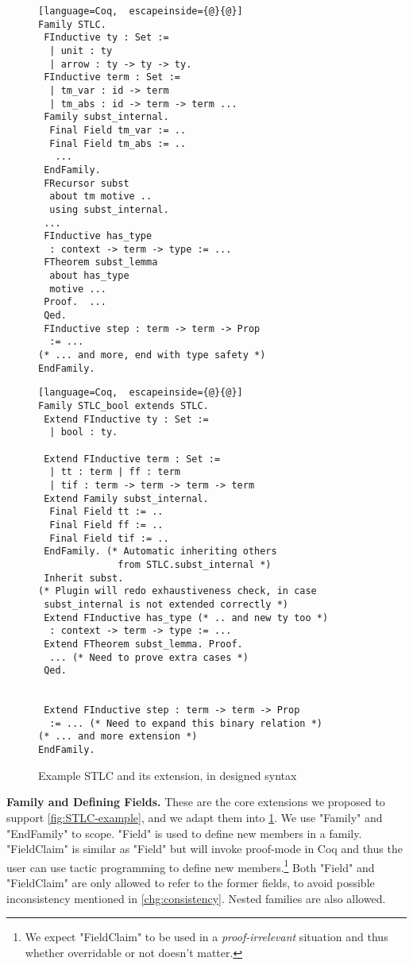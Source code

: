 \begin{figure}[!htb]
  \begin{minipage}[t]{0.47\linewidth}
\begin{lstlisting}[language=Coq,  escapeinside={@}{@}]
Family STLC.
 FInductive ty : Set :=
  | unit : ty
  | arrow : ty -> ty -> ty.
 FInductive term : Set := 
  | tm_var : id -> term 
  | tm_abs : id -> term -> term ...
 Family subst_internal.
  Final Field tm_var := ..
  Final Field tm_abs := ..
   ...
 EndFamily.
 FRecursor subst
  about tm motive ..
  using subst_internal.
 ...
 FInductive has_type 
  : context -> term -> type := ...
 FTheorem subst_lemma 
  about has_type 
  motive ...
 Proof.  ...
 Qed.
 FInductive step : term -> term -> Prop 
  := ...
(* ... and more, end with type safety *)
EndFamily.
\end{lstlisting}
  \end{minipage}
  \begin{minipage}[t]{0.47\linewidth}
\begin{lstlisting}[language=Coq,  escapeinside={@}{@}]
Family STLC_bool extends STLC.
 Extend FInductive ty : Set :=
  | bool : ty.

 Extend FInductive term : Set := 
  | tt : term | ff : term 
  | tif : term -> term -> term -> term
 Extend Family subst_internal.
  Final Field tt := ..
  Final Field ff := ..
  Final Field tif := ..
 EndFamily. (* Automatic inheriting others 
              from STLC.subst_internal *)
 Inherit subst.
(* Plugin will redo exhaustiveness check, in case 
 subst_internal is not extended correctly *)
 Extend FInductive has_type (* .. and new ty too *)
  : context -> term -> type := ...
 Extend FTheorem subst_lemma. Proof.
  ... (* Need to prove extra cases *)
 Qed.


 Extend FInductive step : term -> term -> Prop 
  := ... (* Need to expand this binary relation *)
(* ... and more extension *)
EndFamily.
\end{lstlisting}
  \end{minipage}
  \caption{Example STLC and its extension, in designed syntax}\label{fig:STLC-example2}
\end{figure}

\textbf{Family and Defining Fields.} These are the core extensions we proposed to support \cref{fig:STLC-example}, and we adapt them into \cref{fig:STLC-example2}. We use "Family" and "EndFamily" to scope. "Field" is used to define new members in a family. "FieldClaim" is similar as "Field" but will invoke proof-mode in Coq and thus the user can use tactic programming to define new members.\footnote{We expect "FieldClaim" to be used in a \textit{proof-irrelevant} situation and thus whether overridable or not doesn't matter.} Both "Field" and "FieldClaim" are only allowed to refer to the former fields, to avoid possible inconsistency mentioned in \ref{chg:consistency}.
Nested families are also allowed. 


